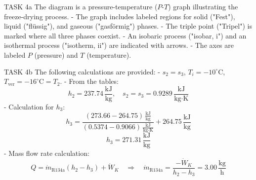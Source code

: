 TASK 4a  
The diagram is a pressure-temperature (\( P \)-\( T \)) graph illustrating the freeze-drying process.  
- The graph includes labeled regions for solid ("Fest"), liquid ("flüssig"), and gaseous ("gasförmig") phases.  
- The triple point ("Tripel") is marked where all three phases coexist.  
- An isobaric process ("isobar, i") and an isothermal process ("isotherm, ii") are indicated with arrows.  
- The axes are labeled \( P \) (pressure) and \( T \) (temperature).  

TASK 4b  
The following calculations are provided:  
- \( s_2 = s_3 \), \( T_i = -10^\circ\text{C} \), \( T_{\text{ver}} = -16^\circ\text{C} = T_2 \).  
- From the tables:  
  \[
  h_2 = 237.74 \, \frac{\text{kJ}}{\text{kg}}, \quad s_2 = s_3 = 0.9289 \, \frac{\text{kJ}}{\text{kg·K}}
  \]  
- Calculation for \( h_3 \):  
  \[
  h_3 = \frac{(273.66 - 264.75) \, \frac{\text{kJ}}{\text{kg}}}{(0.5374 - 0.9066) \, \frac{\text{kJ}}{\text{kg·K}}} + 264.75 \, \frac{\text{kJ}}{\text{kg}}
  \]  
  \[
  h_3 = 271.31 \, \frac{\text{kJ}}{\text{kg}}
  \]  
- Mass flow rate calculation:  
  \[
  Q = \dot{m}_{\text{R134a}} (h_2 - h_3) + \dot{W}_K \quad \Rightarrow \quad \dot{m}_{\text{R134a}} = \frac{-\dot{W}_K}{h_2 - h_3} = 3.00 \, \frac{\text{kg}}{\text{h}}
  \]